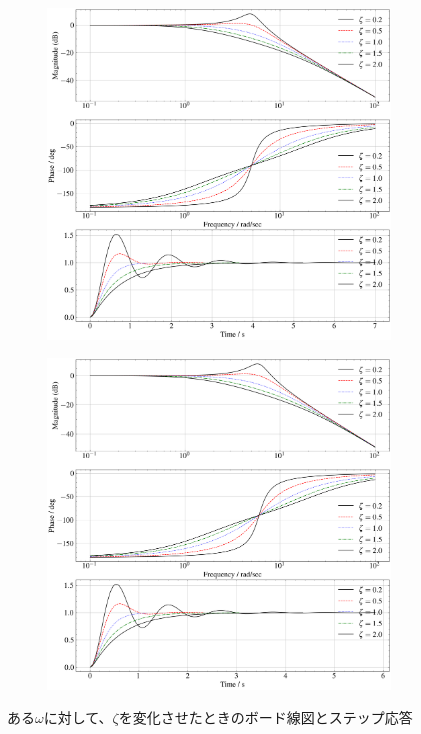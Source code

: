 \begin{figure}
	\centering
	\begin{subfigure}{0.8\linewidth}
		\centering
		\includegraphics[width=0.8\linewidth]{src/figures/bode-phase-step-ideal-group-omega/bode-phase-step-ideal-group-omega-5.png}
		\label{fig:bode-phase-step-ideal-group-omega-5}
	\end{subfigure}
	\begin{subfigure}{0.8\linewidth}
		\centering
		\includegraphics[width=0.8\linewidth]{src/figures/bode-phase-step-ideal-group-omega/bode-phase-step-ideal-group-omega-6.png}
		\label{fig:bode-phase-step-ideal-group-omega-6}
	\end{subfigure}
	\caption{ある$\omega$に対して、$\zeta$を変化させたときのボード線図とステップ応答}\label{fig:bode-phase-step-ideal-group-omega}
\end{figure}


